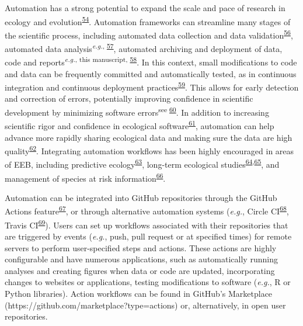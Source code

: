Automation has a strong potential to expand the scale and pace of research in ecology and evolution\textsuperscript{\protect\hyperlink{ref-cfgXxgt1}{54}}.
Automation frameworks can streamline many stages of the scientific process, including automated data collection and data validation\textsuperscript{\protect\hyperlink{ref-lXvpQxeN}{56}}, automated data analysis\textsuperscript{\emph{e.g.}, \protect\hyperlink{ref-Qh7xTLwz}{57}}, automated archiving and deployment of data, code and reports\textsuperscript{\emph{e.g.}, this manuscript, \protect\hyperlink{ref-SirQKFIz}{58}}.
In this context, small modifications to code and data can be frequently committed and automatically tested, as in continuous integration and continuous deployment practices\textsuperscript{\protect\hyperlink{ref-1Ep9EJL6y}{59}}.
This allows for early detection and correction of errors, potentially improving confidence in scientific development by minimizing software errors\textsuperscript{see \protect\hyperlink{ref-ufw0ZdnI}{60}}.
In addition to increasing scientific rigor and confidence in ecological software\textsuperscript{\protect\hyperlink{ref-12103x16N}{61}}, automation can help advance more rapidly sharing ecological data and making sure the data are high quality\textsuperscript{\protect\hyperlink{ref-rTbinQMj}{62}}.
Integrating automation workflows has been highly encouraged in areas of EEB, including predictive ecology\textsuperscript{\protect\hyperlink{ref-mmCOSRfr}{63}}, long-term ecological studies\textsuperscript{\protect\hyperlink{ref-1CJo8lo2v}{64},\protect\hyperlink{ref-RxK4CmfR}{65}}, and management of species at risk information\textsuperscript{\protect\hyperlink{ref-kZzfmBNu}{66}}.

Automation can be integrated into GitHub repositories through the GitHub Actions feature\textsuperscript{\protect\hyperlink{ref-NUXbp429}{67}}, or through alternative automation systems (\emph{e.g.}, Circle CI\textsuperscript{\protect\hyperlink{ref-T03Api6e}{68}}, Travis CI\textsuperscript{\protect\hyperlink{ref-YeFSbfFV}{69}}).
Users can set up workflows associated with their repositories that are triggered by events (\emph{e.g.}, push, pull request or at specified times) for remote servers to perform user-specified steps and actions.
These actions are highly configurable and have numerous applications, such as automatically running analyses and creating figures when data or code are updated, incorporating changes to websites or applications, testing modifications to software (\emph{e.g.}, R or Python libraries).
Action workflows can be found in GitHub's Marketplace (https://github.com/marketplace?type=actions) or, alternatively, in open user repositories.

